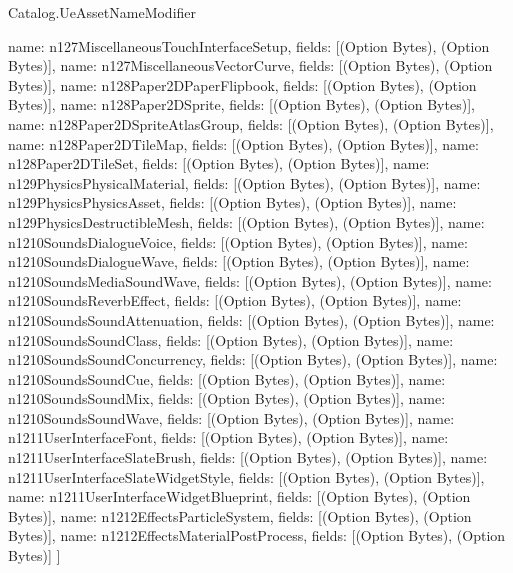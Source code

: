 \begin{lexlean}{Catalog.UeAssetNameModifier}
\begin{semanticmodule}
{    {name: n127MiscellaneousTouchInterfaceSetup, fields: [(Option Bytes), (Option Bytes)]},
    {name: n127MiscellaneousVectorCurve, fields: [(Option Bytes), (Option Bytes)]},
    {name: n128Paper2DPaperFlipbook, fields: [(Option Bytes), (Option Bytes)]},
    {name: n128Paper2DSprite, fields: [(Option Bytes), (Option Bytes)]},
    {name: n128Paper2DSpriteAtlasGroup, fields: [(Option Bytes), (Option Bytes)]},
    {name: n128Paper2DTileMap, fields: [(Option Bytes), (Option Bytes)]},
    {name: n128Paper2DTileSet, fields: [(Option Bytes), (Option Bytes)]},
    {name: n129PhysicsPhysicalMaterial, fields: [(Option Bytes), (Option Bytes)]},
    {name: n129PhysicsPhysicsAsset, fields: [(Option Bytes), (Option Bytes)]},
    {name: n129PhysicsDestructibleMesh, fields: [(Option Bytes), (Option Bytes)]},
    {name: n1210SoundsDialogueVoice, fields: [(Option Bytes), (Option Bytes)]},
    {name: n1210SoundsDialogueWave, fields: [(Option Bytes), (Option Bytes)]},
    {name: n1210SoundsMediaSoundWave, fields: [(Option Bytes), (Option Bytes)]},
    {name: n1210SoundsReverbEffect, fields: [(Option Bytes), (Option Bytes)]},
    {name: n1210SoundsSoundAttenuation, fields: [(Option Bytes), (Option Bytes)]},
    {name: n1210SoundsSoundClass, fields: [(Option Bytes), (Option Bytes)]},
    {name: n1210SoundsSoundConcurrency, fields: [(Option Bytes), (Option Bytes)]},
    {name: n1210SoundsSoundCue, fields: [(Option Bytes), (Option Bytes)]},
    {name: n1210SoundsSoundMix, fields: [(Option Bytes), (Option Bytes)]},
    {name: n1210SoundsSoundWave, fields: [(Option Bytes), (Option Bytes)]},
    {name: n1211UserInterfaceFont, fields: [(Option Bytes), (Option Bytes)]},
    {name: n1211UserInterfaceSlateBrush, fields: [(Option Bytes), (Option Bytes)]},
    {name: n1211UserInterfaceSlateWidgetStyle, fields: [(Option Bytes), (Option Bytes)]},
    {name: n1211UserInterfaceWidgetBlueprint, fields: [(Option Bytes), (Option Bytes)]},
    {name: n1212EffectsParticleSystem, fields: [(Option Bytes), (Option Bytes)]},
    {name: n1212EffectsMaterialPostProcess, fields: [(Option Bytes), (Option Bytes)]}
  ]
}
\end{semanticmodule}
\end{lexlean}
